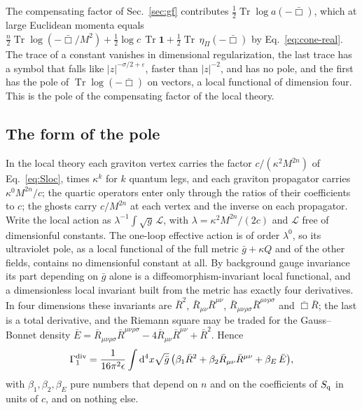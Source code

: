 \documentclass[aps,prd,10pt,twocolumn,superscriptaddress,nofootinbib,floatfix,longbibliography]{revtex4-2}
\newcommand{\dd}{\mathrm{d}}
\newcommand{\Tr}{\operatorname{Tr}}
\begin{document}
The compensating factor of Sec.~\ref{sec:gf} contributes $\frac12\Tr\log a(-\bar\Box)$, which at large Euclidean momenta equals $\frac n2\Tr\log(-\bar\Box/M^2)+\frac12\log c\,\Tr\mathbf 1+\frac12\Tr\,\eta_\Pi(-\bar\Box)$ by Eq.~\eqref{eq:cone-real}. The trace of a constant vanishes in dimensional regularization, the last trace has a symbol that falls like $|z|^{-\sigma/2+\varepsilon}$, faster than $|z|^{-2}$, and has no pole, and the first has the pole of $\Tr\log(-\bar\Box)$ on vectors, a local functional of dimension four. This is the pole of the compensating factor of the local theory.

\subsection{The form of the pole}
\label{sec:form}

In the local theory each graviton vertex carries the factor $c/(\kappa^2M^{2n})$ of Eq.~\eqref{eq:Sloc}, times $\kappa^k$ for $k$ quantum legs, and each graviton propagator carries $\kappa^0M^{2n}/c$; the quartic operators enter only through the ratios of their coefficients to $c$; the ghosts carry $c/M^{2n}$ at each vertex and the inverse on each propagator. Write the local action as $\lambda^{-1}\int\sqrt g\,\mathcal L$, with $\lambda=\kappa^2M^{2n}/(2c)$ and $\mathcal L$ free of dimensionful constants. The one-loop effective action is of order $\lambda^0$, so its ultraviolet pole, as a local functional of the full metric $\bar g+\kappa Q$ and of the other fields, contains no dimensionful constant at all. By background gauge invariance~\cite{Abbott1981,BarvinskyVilkovisky1985} its part depending on $\bar g$ alone is a diffeomorphism-invariant local functional, and a dimensionless local invariant built from the metric has exactly four derivatives. In four dimensions these invariants are $\bar R^2$, $\bar R_{\mu\nu}\bar R^{\mu\nu}$, $\bar R_{\mu\nu\rho\sigma}\bar R^{\mu\nu\rho\sigma}$ and $\bar\Box\bar R$; the last is a total derivative, and the Riemann square may be traded for the Gauss--Bonnet density $\bar E=\bar R_{\mu\nu\rho\sigma}\bar R^{\mu\nu\rho\sigma}-4\bar R_{\mu\nu}\bar R^{\mu\nu}+\bar R^2$. Hence
\begin{equation}
\label{eq:Gamma1}
\Gamma_1^{\rm div}=\frac{1}{16\pi^2\epsilon}\int\dd^4x\sqrt{\bar g}\,\bigl(\beta_1\bar R^2+\beta_2\bar R_{\mu\nu}\bar R^{\mu\nu}+\beta_E\,\bar E\bigr),
\end{equation}
with $\beta_1,\beta_2,\beta_E$ pure numbers that depend on $n$ and on the coefficients of $S_{\rm q}$ in units of $c$, and on nothing else.
\end{document}

